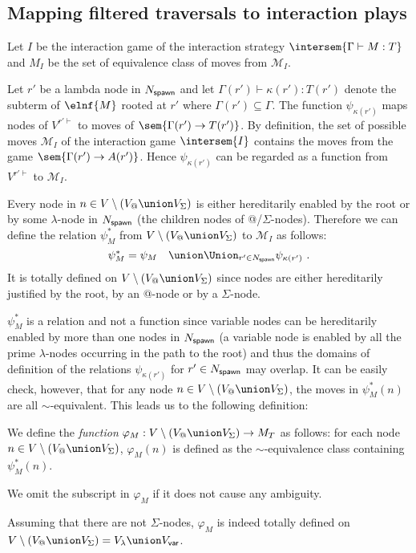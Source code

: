 \subsection{Mapping filtered traversals to interaction plays}

    Let $I$ be the interaction game of the interaction strategy $\intersem{\Gamma \vdash M : T}$ and
    $M_I$ be the set of equivalence class of moves from $\mathcal{M}_I$.

    Let $r'$ be a lambda node in $N_{\sf spawn}$ and let $\Gamma(r') \vdash \kappa(r') : T(r')$ denote the subterm of $\elnf{M}$ rooted at $r'$ where $\Gamma(r')\subseteq \Gamma$.
    The function $\psi_{\kappa(r')}$ maps nodes of $V^{r'\vdash}$
    to moves of $\sem{\Gamma(r') \rightarrow T(r')}$. By definition,
    the set of possible moves $\mathcal{M}_I$ of the interaction game $\intersem{I}$ contains the
    moves from the game $\sem{\Gamma(r') \rightarrow A(r')}$. Hence $\psi_{\kappa(r')}$ can be regarded as a function from $V^{r'\vdash}$ to $\mathcal{M}_I$.

    Every node in $n \in V\setminus (V_@ \union V_\Sigma)$ is either hereditarily enabled by the root or by some $\lambda$-node in $N_{\sf spawn}$ (the children nodes of @/$\Sigma$-nodes). Therefore we can define the relation $\psi^*_M$ from
    $V\setminus (V_@ \union V_\Sigma)$ to $\mathcal{M}_I$ as follows:
    $$ \psi^*_M = \psi_{M} \quad \union \Union_{r' \in N_{\sf spawn}} \psi_{\kappa(r')} \ .$$
    It is totally defined on $V\setminus (V_@ \union V_\Sigma)$ since nodes are either hereditarily justified by the root, by an @-node or by a $\Sigma$-node.

    $\psi^*_M$ is a relation and not a function since variable nodes can be hereditarily enabled by more than one nodes in $N_{\sf spawn}$  (a variable node is enabled by all the prime $\lambda$-nodes occurring in the path to the root) and thus the domains of definition of the relations $\psi_{\kappa(r')}$ for $r' \in N_{\sf spawn}$ may overlap.  It can be easily check, however, that for any node $n \in V\setminus (V_@ \union V_\Sigma)$,
    the moves in $\psi^*_M (n)$ are all $\sim$-equivalent. This leads us to the following definition:

    \begin{definition}
        \label{def:phi mapping}
        We define the \emph{function}
        $\varphi_M:V\setminus (V_@ \union V_\Sigma) \rightarrow M_T$ as follows: for each node $n \in V\setminus (V_@ \union V_\Sigma)$,
        $\varphi_M(n)$ is defined as the $\sim$-equivalence class containing $\psi^*_M (n)$.

        We omit the subscript in $\varphi_M$ if it does not cause any ambiguity.
    \end{definition}
    Assuming that there are not $\Sigma$-nodes, $\varphi_M$ is indeed totally defined on $V \setminus (V_@ \union V_\Sigma) = V_\lambda \union V_{\sf var}$.


